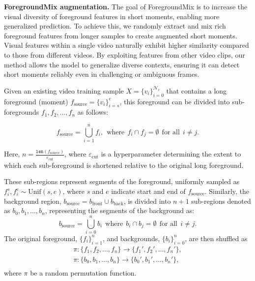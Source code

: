 \vspace{1mm}
\noindent\textbf{ForegroundMix augmentation.} The goal of ForegroundMix is to increase the visual diversity of foreground features in short moments, enabling more generalized prediction. To achieve this, we randomly extract and mix rich foreground features from longer samples to create augmented short moments. Visual features within a single video naturally exhibit higher similarity compared to those from different videos. By exploiting features from other video clips, our method allows the model to generalize diverse contexts, ensuring it can detect short moments reliably even in challenging or ambiguous frames.

Given an existing video training sample \(X = \{v_i\}_{i=0}^{\mathcal{N}_v}\) that contains a long foreground (moment) \( f_\text{source} = \{v_i\}_{i=s}^{e} \),  this foreground can be divided into sub-foregrounds \( f_1, f_2, \dots, f_n \) as follows:

\begin{equation}
f_\text{source} = \bigcup_{i=1}^{n} f_i, \:\: \text{where} \:\:  f_i \cap f_j = \emptyset \:\: \text{for all} \:\: i \neq j.
\end{equation}

Here, \( n = \frac{\texttt{len}(f_\text{source})}{{\varepsilon}_\text{cut}} \), where \(\varepsilon_\text{cut}\) is a hyperparameter determining the extent to which each sub-foreground is shortened relative to the original long foreground.

These sub-regions represent segments of the foreground, uniformly sampled as \( f_i^s, f_i^e \sim \text{Unif}(s, e) \), where $s$ and $e$ indicate start and end of \(f_\text{source}\).
Similarly, the background region, $b_\text{source} = b_\text{front} \cup b_\text{back}$, is divided into \( n+1 \) sub-regions denoted as \( b_0, b_1, \dots, b_{n} \), representing the segments of the background as:
\begin{equation}
b_\text{source} = \bigcup_{i=0}^{n} b_i \:\: \text{where} \:\: b_i \cap b_j = \emptyset \:\: \text{for all} \:\: i \neq j.
\end{equation}
The original foreground, $\{f_i\}_{i=1}^{n}$, and backgrounds, $\{b_i\}_{i=0}^{n}$, are then shuffled as
\begin{equation}
\begin{gathered}
    \pi: \{f_1, f_2, \dots, f_n\} \rightarrow \{f_1', f_2', \dots, f_n'\}, \\
    \pi: \{b_0, b_1, \dots, b_n\} \rightarrow \{b_0', b_1', \dots, b_n'\}, \\
\end{gathered}
\end{equation} where $\pi$ be a random permutation function.

